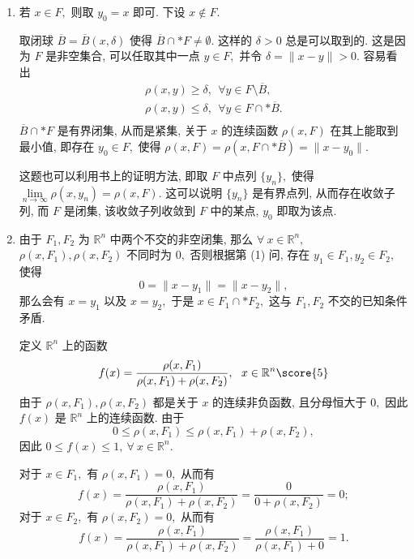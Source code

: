 \begin{solution}
\begin{enumerate}
\item 若 $x \in F,$ 则取 $y_0 = x$ 即可. 下设 $x \not\in F$.

取闭球 $\overline{B} = \overline{B}(x, \delta)$ 使得 $\overline{B} \cap* F \neq \emptyset.$ 这样的 $\delta > 0$ 总是可以取到的. 这是因为 $F$ 是非空集合, 可以任取其中一点 $y \in F,$ 并令 $\delta = \lVert x - y \rVert > 0.$ 容易看出
\begin{equation*}
\begin{gathered}
\rho(x, y) \geqslant \delta, ~~ \forall y \in F \setminus \overline{B}, \\
\rho(x, y) \leqslant \delta, ~~ \forall y \in F \cap* \overline{B}. \\
\end{gathered}
\end{equation*}
$\overline{B} \cap* F$ 是有界闭集, 从而是紧集, 关于 $x$ 的连续函数 $\rho(x, F)$ 在其上能取到最小值, 即存在 $y_0 \in F,$ 使得 $\rho(x, F) = \rho(x, F \cap* \overline{B}) = \lVert x - y_0 \rVert.$ 

这题也可以利用书上的证明方法, 即取 $F$ 中点列 $\{y_n\},$ 使得 $\lim\limits_{n\to\infty} \rho(x, y_n) = \rho(x, F).$ 这可以说明 $\{y_n\}$ 是有界点列, 从而存在收敛子列, 而 $F$ 是闭集, 该收敛子列收敛到 $F$ 中的某点, $y_0$ 即取为该点.

\item 由于 $F_1, F_2$ 为 $\mathbb{R}^n$ 中两个不交的非空闭集, 那么 $\forall ~ x \in \mathbb{R}^n,$ $\rho(x, F_1), \rho(x, F_2)$ 不同时为 $0,$ 否则根据第 (1) 问, 存在 $y_1 \in F_1, y_2 \in F_2,$ 使得
$$0 = \lVert x - y_1 \rVert = \lVert x - y_2 \rVert,$$
那么会有 $x = y_1$ 以及 $x = y_2,$ 于是 $x \in F_1 \cap* F_2,$ 这与 $F_1, F_2$ 不交的已知条件矛盾.

定义 $\mathbb{R}^n$ 上的函数
\begin{equation*}
f(x) = \dfrac{\rho(x, F_1)}{\rho(x, F_1) + \rho(x, F_2)}, ~~ x \in \mathbb{R}^n \score{5}
\end{equation*}
由于 $\rho(x, F_1), \rho(x, F_2)$ 都是关于 $x$ 的连续非负函数, 且分母恒大于 $0,$ 因此$f(x)$ 是 $\mathbb{R}^n$ 上的连续函数. 由于
$$0 \leqslant \rho(x, F_1) \leqslant \rho(x, F_1) + \rho(x, F_2),$$
因此 $0 \leqslant f(x) \leqslant 1, ~ \forall ~ x \in \mathbb{R}^n.$

对于 $x \in F_1,$ 有 $\rho(x, F_1) = 0,$ 从而有
$$f(x) = \dfrac{\rho(x, F_1)}{\rho(x, F_1) + \rho(x, F_2)} = \dfrac{0}{0 + \rho(x, F_2)} = 0;$$
对于 $x \in F_2,$ 有 $\rho(x, F_2) = 0,$ 从而有
$$f(x) = \dfrac{\rho(x, F_1)}{\rho(x, F_1) + \rho(x, F_2)} = \dfrac{\rho(x, F_1)}{\rho(x, F_1) + 0} = 1.$$


\end{enumerate}
\end{solution}
